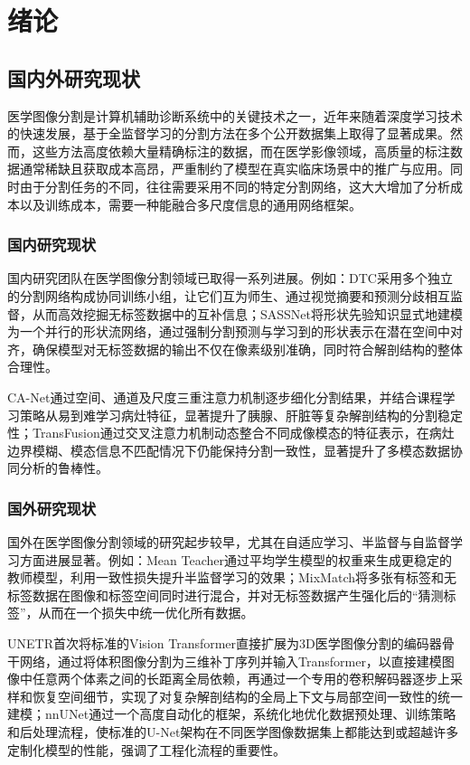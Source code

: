 \documentclass{xduugthesis}
\begin{document}
\chapter{绪论}

\section{国内外研究现状}
医学图像分割是计算机辅助诊断系统中的关键技术之一，近年来随着深度学习技术的快速发展，基于全监督学习的分割方法在多个公开数据集上取得了显著成果。然而，这些方法高度依赖大量精确标注的数据，而在医学影像领域，高质量的标注数据通常稀缺且获取成本高昂，严重制约了模型在真实临床场景中的推广与应用。同时由于分割任务的不同，往往需要采用不同的特定分割网络，这大大增加了分析成本以及训练成本，需要一种能融合多尺度信息的通用网络框架。

\subsection{国内研究现状}
国内研究团队在医学图像分割领域已取得一系列进展。例如：DTC\cite{luo2021semi}采用多个独立的分割网络构成协同训练小组，让它们互为师生、通过视觉摘要和预测分歧相互监督，从而高效挖掘无标签数据中的互补信息；SASSNet\cite{li2020shape}将形状先验知识显式地建模为一个并行的形状流网络，通过强制分割预测与学习到的形状表示在潜在空间中对齐，确保模型对无标签数据的输出不仅在像素级别准确，同时符合解剖结构的整体合理性。

CA-Net\cite{gu2020ca}通过空间、通道及尺度三重注意力机制逐步细化分割结果，并结合课程学习策略从易到难学习病灶特征，显著提升了胰腺、肝脏等复杂解剖结构的分割稳定性；TransFusion\cite{bai2022transfusion}通过交叉注意力机制动态整合不同成像模态的特征表示，在病灶边界模糊、模态信息不匹配情况下仍能保持分割一致性，显著提升了多模态数据协同分析的鲁棒性。

\subsection{国外研究现状}
国外在医学图像分割领域的研究起步较早，尤其在自适应学习、半监督与自监督学习方面进展显著。例如：Mean Teacher\cite{tarvainen2017mean}通过平均学生模型的权重来生成更稳定的教师模型，利用一致性损失提升半监督学习的效果；MixMatch\cite{berthelot2019mixmatch}将多张有标签和无标签数据在图像和标签空间同时进行混合，并对无标签数据产生强化后的“猜测标签”，从而在一个损失中统一优化所有数据。

UNETR\cite{hatamizadeh2022unetr}首次将标准的Vision Transformer直接扩展为3D医学图像分割的编码器骨干网络，通过将体积图像分割为三维补丁序列并输入Transformer，以直接建模图像中任意两个体素之间的长距离全局依赖，再通过一个专用的卷积解码器逐步上采样和恢复空间细节，实现了对复杂解剖结构的全局上下文与局部空间一致性的统一建模；nnUNet\cite{isensee2018nnu}通过一个高度自动化的框架，系统化地优化数据预处理、训练策略和后处理流程，使标准的U-Net架构在不同医学图像数据集上都能达到或超越许多定制化模型的性能，强调了工程化流程的重要性。
\end{document}
